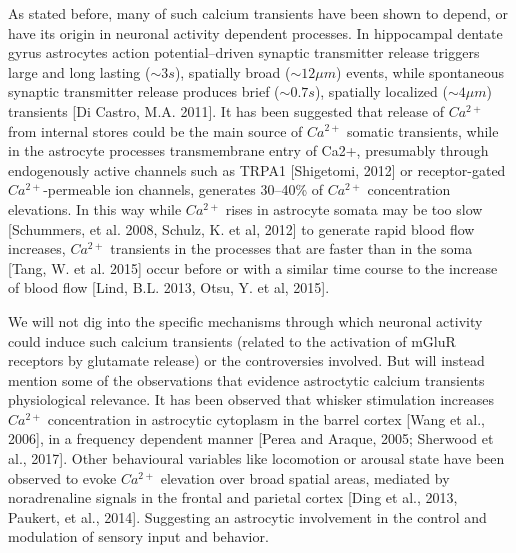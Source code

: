 As stated before, many of such calcium transients have been shown to depend, or have its origin in neuronal activity dependent processes. 
In hippocampal dentate gyrus astrocytes action potential–driven synaptic transmitter release triggers large and long lasting ($\sim3 s$), spatially broad ($\sim12 \mu m$) events, while spontaneous synaptic transmitter release produces brief ($\sim 0.7 s$), spatially localized ($\sim 4 \mu m$) transients [Di Castro, M.A. 2011].
It has been suggested that release of $Ca^{2+}$ from internal stores could be the main source of $Ca^{2+}$ somatic transients, while in the astrocyte processes transmembrane entry of Ca2+, presumably through endogenously active channels such as TRPA1 [Shigetomi, 2012] or receptor-gated $Ca^{2+}$-permeable ion channels, generates 30–40\% of $Ca^{2+}$ concentration elevations. 
In this way while $Ca^{2+}$ rises in astrocyte somata may be too slow [Schummers, et al. 2008, Schulz, K. et al, 2012] to generate rapid blood flow increases, $Ca^{2+}$ transients in the processes that are faster than in the soma [Tang, W. et al. 2015] occur before or with a similar time course to the increase of blood flow [Lind, B.L. 2013, Otsu, Y. et al, 2015].

We will not dig into the specific mechanisms through which neuronal activity could induce such calcium transients (related to the activation of mGluR receptors by glutamate release) or the controversies involved. 
But will instead mention some of the observations that evidence astroctytic calcium transients physiological relevance. 
It has been observed that whisker stimulation increases $Ca^{2+}$ concentration in astrocytic cytoplasm in the barrel cortex [Wang et al., 2006], in a frequency dependent manner [Perea and Araque, 2005; Sherwood et al., 2017]. Other behavioural variables like locomotion or arousal state have been observed to evoke $Ca^{2+}$ elevation over broad spatial areas, mediated by noradrenaline signals in the frontal and parietal cortex [Ding et al., 2013, Paukert, et al., 2014].
Suggesting an astrocytic involvement in the control and modulation of sensory input and behavior. 
